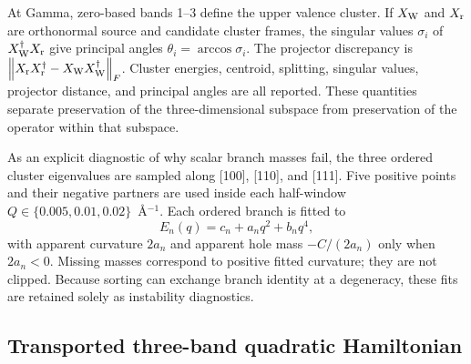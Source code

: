 \documentclass[11pt]{article}
\theoremstyle{definition}
\newcommand{\norm}[1]{\left\lVert#1\right\rVert}
\begin{document}
At Gamma, zero-based bands 1--3 define the upper valence cluster.  If $X_{\rm W}$ and
$X_{\rm r}$ are orthonormal source and candidate cluster frames, the singular values
$\sigma_i$ of $X_{\rm W}^\dagger X_{\rm r}$ give principal angles
$\theta_i=\arccos\sigma_i$.  The projector discrepancy is
$\norm{X_{\rm r}X_{\rm r}^\dagger-X_{\rm W}X_{\rm W}^\dagger}_F$.  Cluster energies,
centroid, splitting, singular values, projector distance, and principal angles are all
reported.  These quantities separate preservation of the three-dimensional subspace
from preservation of the operator within that subspace.

As an explicit diagnostic of why scalar branch masses fail, the three ordered cluster
eigenvalues are sampled along [100], [110], and [111].  Five positive points and their
negative partners are used inside each half-window
$Q\in\{0.005,0.01,0.02\}$~\AA$^{-1}$.  Each ordered branch is fitted to
\begin{equation}
 E_n(q)=c_n+a_nq^2+b_nq^4,
 \label{eq:ordered-quartic}
\end{equation}
with apparent curvature $2a_n$ and apparent hole mass
$-C/(2a_n)$ only when $2a_n<0$.  Missing masses correspond to positive fitted curvature;
they are not clipped.  Because sorting can exchange branch identity at a degeneracy,
these fits are retained solely as instability diagnostics.

\subsection{Transported three-band quadratic Hamiltonian}
\end{document}
